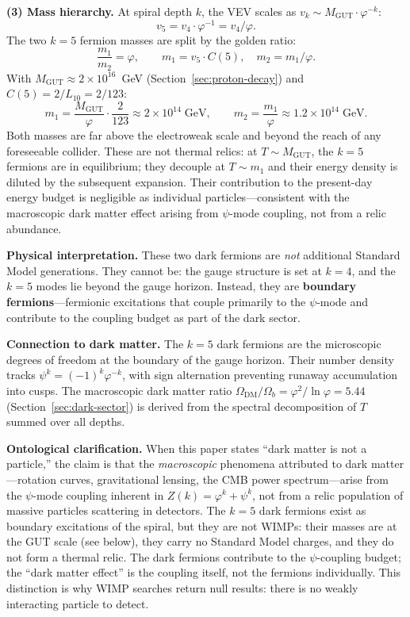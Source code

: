 \documentclass[12pt,a4paper]{article}
\begin{document}
\textbf{(3) Mass hierarchy.} At spiral depth $k$, the VEV scales as $v_k \sim M_{\mathrm{GUT}} \cdot \varphi^{-k}$:
\begin{equation}
v_5 = v_4 \cdot \varphi^{-1} = v_4/\varphi.
\end{equation}
The two $k = 5$ fermion masses are split by the golden ratio:
\begin{equation}
\frac{m_1}{m_2} = \varphi, \qquad m_1 = v_5 \cdot C(5), \quad m_2 = m_1/\varphi.
\end{equation}
With $M_{\mathrm{GUT}} \approx 2 \times 10^{16}$~GeV (Section~\ref{sec:proton-decay}) and $C(5) = 2/L_{10} = 2/123$:
\begin{equation}
m_1 = \frac{M_{\mathrm{GUT}}}{\varphi} \cdot \frac{2}{123} \approx 2 \times 10^{14}\;\text{GeV}, \qquad
m_2 = \frac{m_1}{\varphi} \approx 1.2 \times 10^{14}\;\text{GeV}.
\end{equation}
Both masses are far above the electroweak scale and beyond the reach of any foreseeable collider.  These are not thermal relics: at $T \sim M_{\mathrm{GUT}}$, the $k = 5$ fermions are in equilibrium; they decouple at $T \sim m_1$ and their energy density is diluted by the subsequent expansion.  Their contribution to the present-day energy budget is negligible as individual particles---consistent with the macroscopic dark matter effect arising from $\psi$-mode coupling, not from a relic abundance.

\textbf{Physical interpretation.} These two dark fermions are \emph{not} additional Standard Model generations. They cannot be: the gauge structure is set at $k = 4$, and the $k = 5$ modes lie beyond the gauge horizon. Instead, they are \textbf{boundary fermions}---fermionic excitations that couple primarily to the $\psi$-mode and contribute to the coupling budget as part of the dark sector.

\textbf{Connection to dark matter.} The $k = 5$ dark fermions are the microscopic degrees of freedom at the boundary of the gauge horizon.  Their number density tracks $\psi^k = (-1)^k\varphi^{-k}$, with sign alternation preventing runaway accumulation into cusps. The macroscopic dark matter ratio $\Omega_{\mathrm{DM}}/\Omega_b = \varphi^2/\ln\varphi = 5.44$ (Section~\ref{sec:dark-sector}) is derived from the spectral decomposition of $T$ summed over all depths.

\textbf{Ontological clarification.} When this paper states ``dark matter is not a particle,'' the claim is that the \emph{macroscopic} phenomena attributed to dark matter---rotation curves, gravitational lensing, the CMB power spectrum---arise from the $\psi$-mode coupling inherent in $Z(k) = \varphi^k + \psi^k$, not from a relic population of massive particles scattering in detectors.  The $k = 5$ dark fermions exist as boundary excitations of the spiral, but they are not WIMPs: their masses are at the GUT scale (see below), they carry no Standard Model charges, and they do not form a thermal relic.  The dark fermions contribute to the $\psi$-coupling budget; the ``dark matter effect'' is the coupling itself, not the fermions individually.  This distinction is why WIMP searches return null results: there is no weakly interacting particle to detect.
\end{document}
